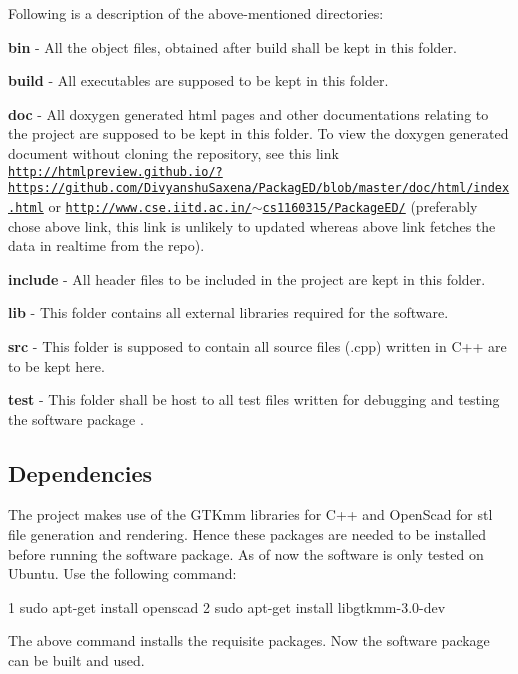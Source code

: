 Following is a description of the above-\/mentioned directories\+:
\begin{DoxyEnumerate}
\item {\bfseries bin} -\/ All the object files, obtained after build shall be kept in this folder.
\item {\bfseries build} -\/ All executables are supposed to be kept in this folder.
\item {\bfseries doc} -\/ All doxygen generated html pages and other documentations relating to the project are supposed to be kept in this folder. To view the doxygen generated document without cloning the repository, see this link \href{http://htmlpreview.github.io/?https://github.com/DivyanshuSaxena/PackagED/blob/master/doc/html/index.html}{\tt http\+://htmlpreview.\+github.\+io/?https\+://github.\+com/\+Divyanshu\+Saxena/\+Packag\+E\+D/blob/master/doc/html/index.\+html} or \href{http://www.cse.iitd.ac.in/~cs1160315/PackageED/}{\tt http\+://www.\+cse.\+iitd.\+ac.\+in/$\sim$cs1160315/\+Package\+E\+D/} (preferably chose above link, this link is unlikely to updated whereas above link fetches the data in realtime from the repo).
\item {\bfseries include} -\/ All header files to be included in the project are kept in this folder.
\item {\bfseries lib} -\/ This folder contains all external libraries required for the software.
\item {\bfseries src} -\/ This folder is supposed to contain all source files (.cpp) written in C++ are to be kept here.
\item {\bfseries test} -\/ This folder shall be host to all test files written for debugging and testing the software package .
\end{DoxyEnumerate}

\subsection*{Dependencies}

The project makes use of the G\+T\+Kmm libraries for C++ and Open\+Scad for stl file generation and rendering. Hence these packages are needed to be installed before running the software package. As of now the software is only tested on Ubuntu. Use the following command\+: 
\begin{DoxyCode}
1 sudo apt-get install openscad 
2 sudo apt-get install libgtkmm-3.0-dev
\end{DoxyCode}
 The above command installs the requisite packages. Now the software package can be built and used.

